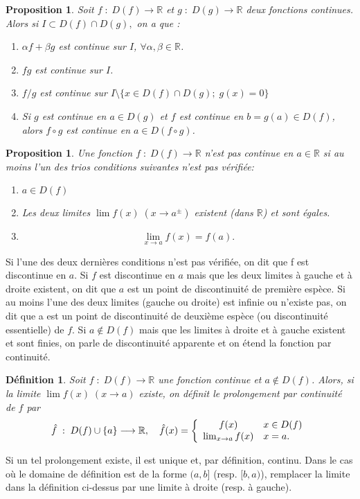 \documentclass[a4paper, 12pt, french, twoside]{article}
\newtheorem{proposition}[theorem]{Proposition}
\newtheorem{defi}[theorem]{Définition}
\newcommand{\Rr}{{\mathbb{R}}}
\begin{document}
\begin{proposition}
    Soit  $f\;:\;D(f)\longrightarrow\Rr$  et $g\;:\;D(g)\longrightarrow\Rr$ deux fonctions continues.
    Alors si $I\subset D(f) \cap D(g),$ on a que :
    \begin{enumerate}
        \item $\alpha f+\beta g$ est continue sur $I$, $\forall \alpha, \beta \in\Rr$.
        \item $fg$ est continue sur $I$.
        \item $f/g$ est continue sur $I\setminus\{x\in D(f)\cap D(g); \;g(x)=0\}$
        \item Si $g$ est continue en $a\in D(g)$ et $f$ est continue en $b=g(a)\in D(f)$, alors $f\circ g$ est continue en $a\in D(f\circ g)$.
    \end{enumerate}
\end{proposition}
\begin{proposition}
    Une fonction $f\;:\;D(f)\longrightarrow\Rr$ n'est pas continue en $a\in\Rr$ si au moins l'un des trios conditions suivantes n'est pas vérifiée:
    \begin{enumerate}
        \item $a\in D(f)$
        \item  Les deux limites $\lim f(x)\; (x\rightarrow a^{\pm})$ existent (dans $\Rr$) et sont égales.
        \item \[
        \lim_{x\rightarrow a}f(x)=f(a).
        \]
    \end{enumerate}
\end{proposition}
Si l'une des deux dernières conditions n'est pas vérifiée, on dit que f est discontinue en $a$. Si $f$ est discontinue en $a$ mais que les deux limites à gauche et à droite existent, on dit que $a$ est un point de discontinuité de première espèce. Si au moins l'une des deux limites (gauche ou droite) est infinie ou n'existe pas, on dit que a est un point de discontinuité de deuxième espèce (ou discontinuité essentielle) de $f$. Si $a\not\in D(f)$ mais que les limites à droite et à gauche existent et sont finies, on parle de discontinuité apparente et on étend la fonction par continuité.

\begin{defi}
    Soit $f\;:\;D(f)\longrightarrow\Rr$ une fonction continue et $a\not\in D(f)$.
    Alors, si la limite $\lim f(x) \; (x\rightarrow a)$ existe, on définit le prolongement par continuité de $f$ par \[
    \hat{f} \;:\; D(f)\cup \{a\} \longrightarrow\Rr, \quad \hat{f}(x)=
     \left \{
   \begin{array}{c l}
      f(x) & x\in D(f)\\
      \lim_{x\rightarrow a}f(x) & x=a. 
   \end{array}
   \right .
    \]
\end{defi}
Si un tel prolongement existe, il est unique et, par définition, continu. Dans le cas où le domaine de définition est de la forme $(a,b]$ (resp. $[b,a)$), remplacer la limite dans la définition ci-dessus par une limite à droite (resp. à gauche).
\end{document}
